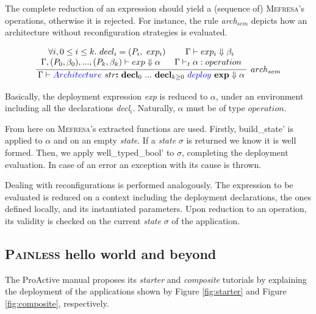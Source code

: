 				The complete reduction of an expression should yield a (sequence of) \textsc{Mefresa}'s \textsf{operation}s,
			otherwise it is rejected. For instance, the rule \textit{arch$_{sem}$} depicts how an architecture without
			reconfiguration strategies is evaluated.
			
			$$
\infer[arch_{sem}]{\env \vdash \blue{Architecture} \ str \textbf{:} \ \textbf{decl}_0 \ ... \ \textbf{decl}_{k\geq 0} \ \blue{deploy} \ \textbf{exp}  \Downarrow \alpha}
{  \begin{tabular}{ c } 
		$\forall i, 0 \leq i \leq k. \ decl_i = (P_i, \ exp_i)$ \ \ \ \ \ \ $\env \vdash exp_i \Downarrow \beta_i$\\
       $\env, (P_0, \beta_0), ..., (P_k, \beta_k) \vdash exp \Downarrow \alpha$ \ \ \ \ $\env \vdash_t \alpha : operation$
	\end{tabular}} 
$$

	\noindent Basically, the deployment expression \textit{exp} is reduced to $\alpha$, under an environment including
	all the declarations \textit{decl$_i$}. Naturally, $\alpha$ must be of type $operation$. 
	
	From here on \textsc{Mefresa}'s extracted  functions are used. Firstly,
	\textsf{build\_state'} is applied to $\alpha$ and on an empty \textit{state}. If a \textit{state} $\sigma$
	is returned we know it is \textsf{well formed}. Then, we apply \textsf{well\_typed\_bool'} to $\sigma$,
	completing the deployment evaluation. In case of an error an exception with its cause is thrown. 
	
	Dealing with reconfigurations is performed analogously. The expression to be evaluated is reduced on a context including
	the deployment declarations, the ones defined locally, and its instantiated parameters. 
	Upon reduction to an \textsf{operation}, its validity is checked on the current \textit{state} $\sigma$ of the application.
	
		
		
\subsection{\textsc{Painless} hello world and beyond}		
\label{sub:hello}	

	 The ProActive manual proposes its \textit{starter} and \textit{composite}
	 tutorials by explaining the deployment of the applications shown by Figure \ref{fig:starter} and
	 Figure \ref{fig:composite}, respectively.
	 
